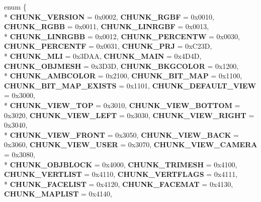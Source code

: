 \begin{DoxyCompactItemize}
\item 
\hypertarget{class_assimp_1_1_d3_d_s_1_1_discreet3_d_s_a3e496d6e8da352a4ca356281a6244b90}{enum \{ \\*
{\bfseries C\+H\+U\+N\+K\+\_\+\+V\+E\+R\+S\+I\+O\+N} = 0x0002, 
{\bfseries C\+H\+U\+N\+K\+\_\+\+R\+G\+B\+F} = 0x0010, 
{\bfseries C\+H\+U\+N\+K\+\_\+\+R\+G\+B\+B} = 0x0011, 
{\bfseries C\+H\+U\+N\+K\+\_\+\+L\+I\+N\+R\+G\+B\+F} = 0x0013, 
\\*
{\bfseries C\+H\+U\+N\+K\+\_\+\+L\+I\+N\+R\+G\+B\+B} = 0x0012, 
{\bfseries C\+H\+U\+N\+K\+\_\+\+P\+E\+R\+C\+E\+N\+T\+W} = 0x0030, 
{\bfseries C\+H\+U\+N\+K\+\_\+\+P\+E\+R\+C\+E\+N\+T\+F} = 0x0031, 
{\bfseries C\+H\+U\+N\+K\+\_\+\+P\+R\+J} = 0x\+C23\+D, 
\\*
{\bfseries C\+H\+U\+N\+K\+\_\+\+M\+L\+I} = 0x3\+D\+A\+A, 
{\bfseries C\+H\+U\+N\+K\+\_\+\+M\+A\+I\+N} = 0x4\+D4\+D, 
{\bfseries C\+H\+U\+N\+K\+\_\+\+O\+B\+J\+M\+E\+S\+H} = 0x3\+D3\+D, 
{\bfseries C\+H\+U\+N\+K\+\_\+\+B\+K\+G\+C\+O\+L\+O\+R} = 0x1200, 
\\*
{\bfseries C\+H\+U\+N\+K\+\_\+\+A\+M\+B\+C\+O\+L\+O\+R} = 0x2100, 
{\bfseries C\+H\+U\+N\+K\+\_\+\+B\+I\+T\+\_\+\+M\+A\+P} = 0x1100, 
{\bfseries C\+H\+U\+N\+K\+\_\+\+B\+I\+T\+\_\+\+M\+A\+P\+\_\+\+E\+X\+I\+S\+T\+S} = 0x1101, 
{\bfseries C\+H\+U\+N\+K\+\_\+\+D\+E\+F\+A\+U\+L\+T\+\_\+\+V\+I\+E\+W} = 0x3000, 
\\*
{\bfseries C\+H\+U\+N\+K\+\_\+\+V\+I\+E\+W\+\_\+\+T\+O\+P} = 0x3010, 
{\bfseries C\+H\+U\+N\+K\+\_\+\+V\+I\+E\+W\+\_\+\+B\+O\+T\+T\+O\+M} = 0x3020, 
{\bfseries C\+H\+U\+N\+K\+\_\+\+V\+I\+E\+W\+\_\+\+L\+E\+F\+T} = 0x3030, 
{\bfseries C\+H\+U\+N\+K\+\_\+\+V\+I\+E\+W\+\_\+\+R\+I\+G\+H\+T} = 0x3040, 
\\*
{\bfseries C\+H\+U\+N\+K\+\_\+\+V\+I\+E\+W\+\_\+\+F\+R\+O\+N\+T} = 0x3050, 
{\bfseries C\+H\+U\+N\+K\+\_\+\+V\+I\+E\+W\+\_\+\+B\+A\+C\+K} = 0x3060, 
{\bfseries C\+H\+U\+N\+K\+\_\+\+V\+I\+E\+W\+\_\+\+U\+S\+E\+R} = 0x3070, 
{\bfseries C\+H\+U\+N\+K\+\_\+\+V\+I\+E\+W\+\_\+\+C\+A\+M\+E\+R\+A} = 0x3080, 
\\*
{\bfseries C\+H\+U\+N\+K\+\_\+\+O\+B\+J\+B\+L\+O\+C\+K} = 0x4000, 
{\bfseries C\+H\+U\+N\+K\+\_\+\+T\+R\+I\+M\+E\+S\+H} = 0x4100, 
{\bfseries C\+H\+U\+N\+K\+\_\+\+V\+E\+R\+T\+L\+I\+S\+T} = 0x4110, 
{\bfseries C\+H\+U\+N\+K\+\_\+\+V\+E\+R\+T\+F\+L\+A\+G\+S} = 0x4111, 
\\*
{\bfseries C\+H\+U\+N\+K\+\_\+\+F\+A\+C\+E\+L\+I\+S\+T} = 0x4120, 
{\bfseries C\+H\+U\+N\+K\+\_\+\+F\+A\+C\+E\+M\+A\+T} = 0x4130, 
{\bfseries C\+H\+U\+N\+K\+\_\+\+M\+A\+P\+L\+I\+S\+T} = 0x4140, 
}
\end{DoxyCompactItemize}
